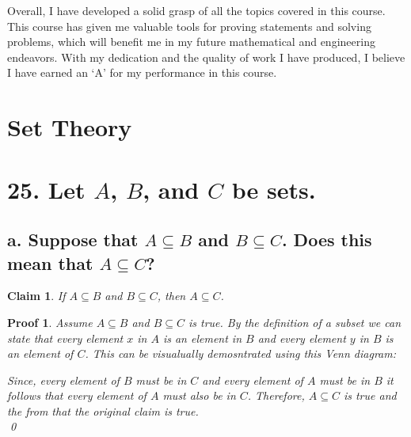 \documentclass{article}
\newtheorem*{claim}{Claim}
\newtheorem*{poof}{Proof}
\begin{document}
Overall, I have developed a solid grasp of all the topics covered in this course. This course has given me valuable tools for proving statements and solving problems, which will benefit me in my future mathematical and engineering endeavors. With my dedication and the quality of work I have produced, I believe I have earned an `A' for my performance in this course.


\newpage
\section*{Set Theory}
\section*{25. Let $A$, $B$, and $C$ be sets.}
\subsection*{a. Suppose that $A \subseteq B$ and $B \subseteq C$. Does this mean that $A \subseteq C$?}
\begin{claim}
    If $A \subseteq B$ and $B \subseteq C$, then $A \subseteq C$.
\end{claim}
\begin{poof}
    Assume $A \subseteq B$ and $B \subseteq C$ is true. By the definition of a subset we can state that every element $x$ in $A$ is an element in $B$ and every element $y$ in $B$ is an element of $C$. This can be visualually demosntrated using this Venn diagram:
    \begin{center}
    \end{center}
    Since, every element of $B$ must be in $C$ and every element of $A$ must be in $B$ it follows that every element of $A$ must also be in $C$. Therefore, $A \subseteq C$ is true and the  from that the original claim is true. \\
    \qed
\end{poof}
\end{document}
